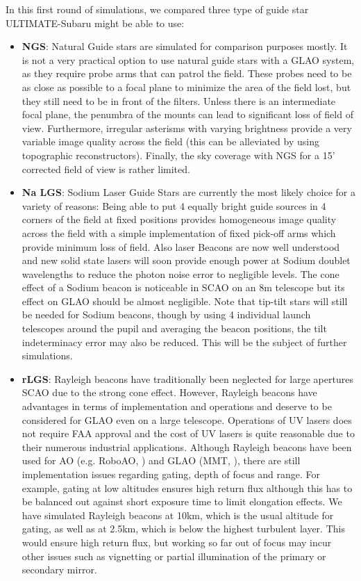 \documentclass[aas_macros,10pt]{article}
\begin{document}
In this first round of simulations, we compared three type of guide star ULTIMATE-Subaru might be able to use:
\begin{itemize}
\item {\bf NGS}: Natural Guide stars are simulated for comparison purposes mostly. It is not a very practical option to use natural guide stars with a GLAO system, as they require probe arms that can patrol the field. These probes need to be as close as possible to a focal plane to minimize the area of the field lost, but they still need to be in front of the filters. Unless there is an intermediate focal plane, the penumbra of the mounts can lead to significant loss of field of view. Furthermore, irregular asterisms with varying brightness provide a very variable image quality across the field (this can be alleviated by using topographic reconstructors). Finally, the sky coverage with NGS for a 15' corrected field of view is rather limited.
\item {\bf Na LGS}: Sodium Laser Guide Stars are currently the most likely choice for a variety of reasons: Being able to put 4 equally bright  guide sources in 4 corners of the field at fixed positions provides homogeneous image quality across the field with a simple implementation of fixed pick-off arms which provide minimum loss of field. Also laser Beacons are now well understood and new solid state lasers will soon provide enough power at Sodium doublet wavelengths to reduce the photon noise error to negligible levels. The cone effect of a Sodium beacon is noticeable in SCAO on an 8m telescope but its effect on GLAO should be almost negligible. Note that tip-tilt stars will still be needed for Sodium beacons, though by using 4 individual launch telescopes around the pupil and averaging the beacon positions, the tilt indeterminacy error may also be reduced. This will be the subject of further simulations.
\item {\bf rLGS}: Rayleigh beacons have traditionally been neglected for large apertures SCAO due to the strong cone effect. However, Rayleigh beacons have advantages in terms of implementation and operations and deserve to be considered for GLAO even on a large telescope. Operations of UV lasers does not require FAA approval and the cost of UV lasers is quite reasonable due to their numerous industrial applications. Although Rayleigh beacons have been used for AO (e.g. RoboAO, \cite{Baranec13}) and GLAO (MMT, \cite{Baranec07, Hart10}), there are still implementation issues regarding gating, depth of focus and range. For example, gating at low altitudes ensures high return flux although this has to be balanced out against short exposure time to limit elongation effects. We have simulated Rayleigh beacons at 10km, which is the usual altitude for gating, as well as at 2.5km, which is below the highest turbulent layer. This would ensure high return flux, but working so far out of focus may incur other issues such as vignetting or partial illumination of the primary or secondary mirror. 
\end{itemize}
\end{document}

